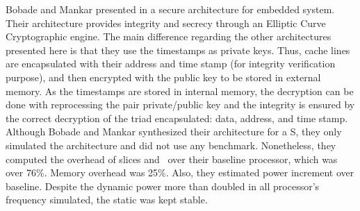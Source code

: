 
Bobade and Mankar presented in \cite{Bobade2015:SecurityFPGA} a secure architecture for embedded system. Their architecture provides integrity and secrecy through an Elliptic Curve Cryptographic engine. The main difference regarding the other architectures presented here is that they use the timestamps as private keys. Thus, cache lines are encapsulated with their address and time stamp (for integrity verification purpose), and then encrypted with the public key to be stored in external memory. As the timestamps are stored in internal memory, the decryption can be done with reprocessing the pair private\slash{}public key and the integrity is ensured by the correct decryption of the triad encapsulated: data, address, and time stamp. Although Bobade and Mankar synthesized their architecture for a {\fpga}S, they only simulated the architecture and did not use any benchmark. Nonetheless, they computed the overhead of slices and \luts~over their baseline processor, which was over 76\%. Memory overhead was 25\%. Also, they estimated power increment over baseline. Despite the dynamic power more than doubled in all processor's frequency simulated, the static was kept stable.

